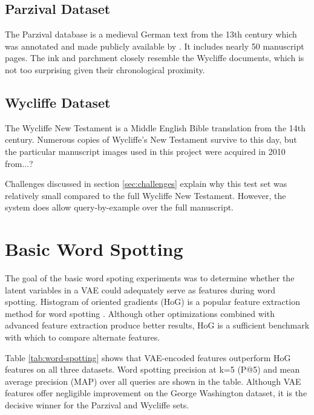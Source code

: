 \documentclass[final]{ukthesis}
\begin{document}
\subsection{Parzival Dataset}
The Parzival database is a medieval German text from the 13th century which was annotated and made publicly available by \cite{fischer2010ground}. It includes nearly 50 manuscript pages. The ink and parchment closely resemble the Wycliffe documents, which is not too surprising given their chronological proximity.

\subsection{Wycliffe Dataset}
The Wycliffe New Testament is a Middle English Bible translation from the 14th century. Numerous copies of Wycliffe's New Testament survive to this day, but the particular manuscript images used in this project were acquired in 2010 from...?

Challenges discussed in section \ref{sec:challenges} explain why this test set was relatively small compared to the full Wycliffe New Testament. However, the system does allow query-by-example over the full manuscript.


%
%
\section{Basic Word Spotting}
\label{sec:basic-results}
The goal of the basic word spoting experiments was to determine whether the latent variables in a VAE could adequately serve as features during word spotting. Histogram of oriented gradients (HoG) is a popular feature extraction method for word spotting \cite{giotis2017survey}. Although other optimizations combined with advanced feature extraction produce better results, HoG is a sufficient benchmark with which to compare alternate features.

Table \ref{tab:word-spotting} shows that VAE-encoded features outperform HoG features on all three datasets. Word spotting precision at k=5 (P@5) and mean average precision (MAP) over all queries are shown in the table. Although VAE features offer negligible improvement on the George Washington dataset, it is the decisive winner for the Parzival and Wycliffe sets.
\end{document}
